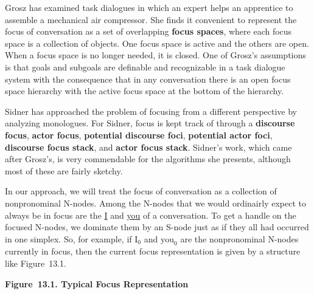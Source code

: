 \documentclass{article}
\begin{document}
Grosz has examined task dialogues in which an expert helps an
apprentice to assemble a mechanical air compressor.  She finds
it convenient to represent the focus of conversation as a set of
overlapping
\textbf{focus spaces}, where each focus space is a collection of
objects. One focus space is active and the others are open. When
a focus space is no longer needed, it is closed. One of Grosz's
assumptions is that goals and subgoals are definable and
recognizable in a task dialogue system with the consequence that
in any conversation there is an open focus space hierarchy with
the active focus space at the bottom of the hierarchy.

Sidner has approached the problem of focusing from a different
perspective by analyzing monologues. For Sidner, focus is kept
track of through a
\textbf{discourse focus},
\textbf{actor focus},
\textbf{potential discourse foci},
\textbf{potential actor foci},
\textbf{discourse focus stack}, and
\textbf{actor focus stack}. Sidner's work, which came after
Grosz's, is very commendable for the algorithms she presents,
although most of these are fairly sketchy.

In our approach, we will treat the focus of conversation as a
collection of nonpronominal N-nodes. Among the N-nodes that we
would ordinairly expect to always be in focus are the
\underline{I} and \underline{you} of a conversation. To get a
handle on the focused N-nodes, we dominate them by an S-node
just as if they all had occurred in one simplex. So, for
example, if \underline{${\textrm{I}_{\textrm{0}}}$} and \underline{${\textrm{you}_{\textrm{0}}}$} are the
nonpronominal N-nodes currently in focus, then the current focus
representation is given by a structure like Figure~13.1.

\bigbreak
\begin{minipage}{\textwidth}
\centering
{}
\bigbreak
\textbf{Figure~13.1. Typical Focus Representation}
\end{minipage}
\bigbreak
\end{document}
